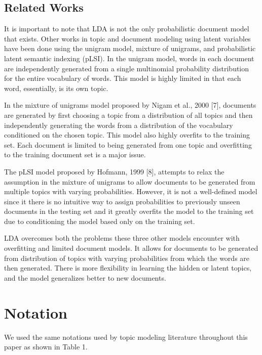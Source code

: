 \documentclass{article} %
\begin{document}
\subsection{Related Works}
It is important to note that LDA is not the only probabilistic document model that exists. Other works in topic and
document modeling using latent variables have been done using the unigram model, mixture of unigrams, and
probabilistic latent semantic indexing (pLSI). In the unigram model, words in each document are independently
generated from a single multinomial probability distribution for the entire vocabulary of words. This model is highly
 limited in that each word,
essentially, is its own topic.

In the mixture of unigrams model proposed by Nigam et al., 2000 [7], documents are
generated by first choosing a topic from a distribution of all topics and then independently generating the words
from a distribution of the vocabulary conditioned on the chosen topic. This model also highly overfits to the
 training set.
 Each document is limited to being
generated from one topic and overfitting to the training document set is a major issue.

The pLSI model proposed by Hofmann, 1999 [8], attempts to relax the assumption in the
mixture of unigrams to allow documents to be generated from multiple topics with varying probabilities. However,
 it is not a well-defined model since it there is no intuitive way to assign probabilities to previously unseen
documents in the testing set and it greatly overfits the model to the training set due to conditioning the model
based only on the training set.

LDA overcomes both the problems these three other models encounter with overfitting and limited document
models. It allows for documents to be generated from distribution of topics with varying probabilities from which
the words are then generated. There is more flexibility in learning the
hidden or latent topics, and the model generalizes better to new documents.

\section{Notation}
We used the same notations used by topic modeling literature throughout this paper as shown in Table 1.
\end{document}
